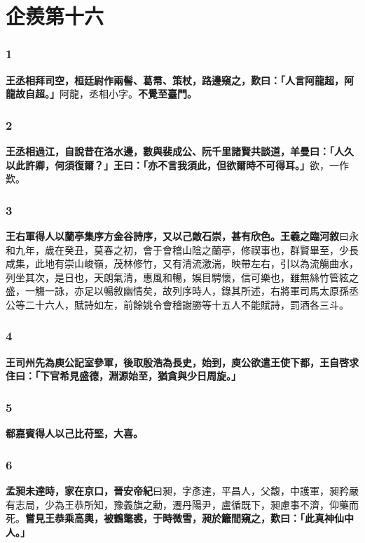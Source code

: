 \chapter{企羨第十六}

\subsection*{1}

\textbf{王丞相拜司空，桓廷尉作兩髻、葛帬、策杖，路邊窺之，歎曰：「人言阿龍超，阿龍故自超。」}{\footnotesize 阿龍，丞相小字。}\textbf{不覺至臺門。}

\subsection*{2}

\textbf{王丞相過江，自說昔在洛水邊，數與裴成公、阮千里諸賢共談道，羊曼曰：「人久以此許卿，何須復爾？」王曰：「亦不言我須此，但欲爾時不可得耳。」}{\footnotesize 欲，一作歎。}

\subsection*{3}

\textbf{王右軍得人以蘭亭集序方金谷詩序，又以己敵石崇，甚有欣色。}{\footnotesize \textbf{王羲之臨河敘}曰永和九年，歲在癸丑，莫春之初，會于會稽山陰之蘭亭，修禊事也，群賢畢至，少長咸集，此地有崇山峻嶺，茂林修竹，又有清流激湍，映帶左右，引以為流觴曲水，列坐其次，是日也，天朗氣清，惠風和暢，娛目騁懷，信可樂也，雖無絲竹管絃之盛，一觴一詠，亦足以暢敘幽情矣，故列序時人，錄其所述，右將軍司馬太原孫丞公等二十六人，賦詩如左，前餘姚令會稽謝勝等十五人不能賦詩，罰酒各三斗。}

\subsection*{4}

\textbf{王司州先為庾公記室參軍，後取殷浩為長史，始到，庾公欲遣王使下都，王自啓求住曰：「下官希見盛德，淵源始至，猶貪與少日周旋。」}

\subsection*{5}

\textbf{郗嘉賓得人以己比苻堅，大喜。}

\subsection*{6}

\textbf{孟昶未達時，家在京口，}{\footnotesize \textbf{晉安帝紀}曰昶，字彥達，平昌人，父馥，中護軍，昶矜嚴有志局，少為王恭所知，豫義旗之勳，遷丹陽尹，盧循既下，昶慮事不濟，仰藥而死。}\textbf{嘗見王恭乘高輿，被鶴氅裘，于時微雪，昶於籬間窺之，歎曰：「此真神仙中人。」}